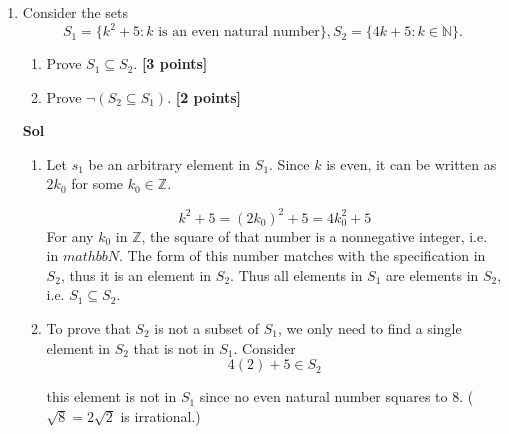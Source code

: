\documentclass{article}
\begin{document}
\begin{enumerate}
\textbf{Sol}

This statement is Incorrect. A counterexample lies in \(x=\sqrt2, y=1, n=2, m=1\). (note, to prove that the forall is incorrect, we only need to find a single instance that fails the claim). 

\begin{equation}
    \sqrt2 ^2 \cdot 1^1 = 2 \in \mathbb N
\end{equation}


\item Consider the sets 
\[ S_1 = \{k^2+5: k \mbox{ is an even natural number} \},   S_2 = \{4k+5: k \in \mathbb{N} \}.    \]
\begin{enumerate}
	\item Prove $S_1 \subseteq S_2$. \textbf{[3 points]}
	\item Prove $\neg (S_2 \subseteq S_1)$. \textbf{[2 points]}
\end{enumerate}

\textbf{Sol}

\begin{enumerate}
    \item Let \(s_1\) be an arbitrary element in \(S_1\). Since \(k\) is even, it can be written as \(2k_0\) for some \(k_0\in\mathbb Z\). 
    
    \begin{equation}
        k^2+5 = (2k_0)^2+5 = 4k_0^2+5
    \end{equation}
    For any \(k_0\) in \(\mathbb Z\), the square of that number is a nonnegative integer, i.e. in \(mathbb N\). The form of this number matches with the specification in \(S_2\), thus it is an element in \(S_2\). Thus all elements in \(S_1\) are elements in \(S_2\),  i.e. \(S_1\subseteq S_2\). 

    \item To prove that \(S_2\) is not a subset of \(S_1\), we only need to find a single element in \(S_2\) that is not in \(S_1\). Consider \begin{equation}
        4(2)+5\in S_2
    \end{equation}

    this element is not in \(S_1\) since no even natural number squares to 8. (\(\sqrt{8} = 2\sqrt2\) is irrational.)
\end{enumerate}


\end{enumerate}
\end{document}
